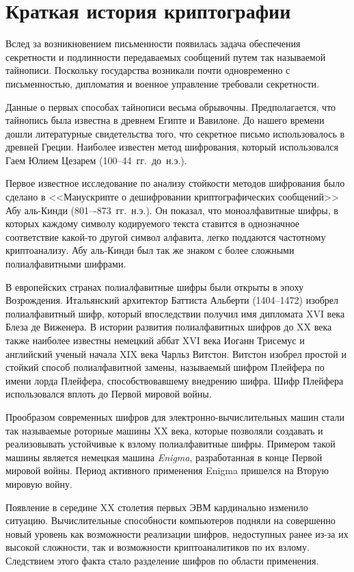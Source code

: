 \section{Краткая история криптографии}

Вслед за возникновением письменности появилась задача обеспечения секретности и подлинности передаваемых сообщений путем так называемой тайнописи. Поскольку государства возникали почти одновременно с письменностью, дипломатия и военное управление требовали секретности.

Данные о первых способах тайнописи весьма обрывочны. Предполагается, что тайнопись была известна в древнем Египте и Вавилоне. До нашего времени дошли литературные свидетельства того, что секретное письмо использовалось в древней Греции. Наиболее известен метод шифрования, который использовался Гаем Юлием Цезарем (100--44~гг.~до~н.э.).

Первое известное исследование по анализу стойкости методов шифрования было сделано в <<Манускрипте о дешифровании криптографических сообщений>> Абу аль-Кинди (801–-873~гг.~н.э.). Он показал, что моноалфавитные шифры, в которых каждому символу кодируемого текста ставится в однозначное соответствие какой-то другой символ алфавита, легко поддаются частотному криптоанализу. Абу аль-Кинди был так же знаком с более сложными полиалфавитными шифрами.

В европейских странах полиалфавитные шифры были открыты в эпоху Возрождения. Итальянский архитектор Баттиста Альберти (1404--1472) изобрел полиалфавитный шифр, который впоследствии получил имя дипломата XVI века Блеза де Виженера. В истории развития полиалфавитных шифров до XX века также наиболее известны немецкий аббат XVI века Иоганн Трисемус и английский ученый начала XIX века Чарльз Витстон. Витстон изобрел простой и стойкий способ полиалфавитной замены, называемый шифром Плейфера по имени лорда Плейфера, способствовавшему внедрению шифра. Шифр Плейфера использовался вплоть до Первой мировой войны.

Прообразом современных шифров для электронно-вычислительных машин стали так называемые роторные машины XX века, которые позволяли создавать и реализовывать устойчивые к взлому полиалфавитные шифры. Примером такой машины является немецкая машина \emph{Enigma}, разработанная в конце Первой мировой войны. Период активного применения Enigma пришелся на Вторую мировую войну.

Появление в середине XX столетия первых ЭВМ кардинально изменило ситуацию. Вычислительные способности компьютеров подняли на совершенно новый уровень как возможности реализации шифров, недоступных ранее из-за их высокой сложности, так и возможности криптоаналитиков по их взлому. Следствием этого факта стало разделение шифров по области применения.

